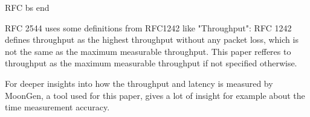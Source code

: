 RFC bs end %


RFC 2544 uses some definitions from RFC1242 \cite{rfc1242} like
"Throughput": RFC 1242 defines throughput as the highest throughput
without any packet loss, which is not the same as the maximum
measurable throughput. This paper refferes to throughput as the
maximum measurable throughput if not specified otherwise.




For deeper insights into how the throughput and latency is measured by
MoonGen, a tool used for this paper, \cite{emmerich2015moongen}
gives a lot of insight for example about the time measurement
accuracy. 




